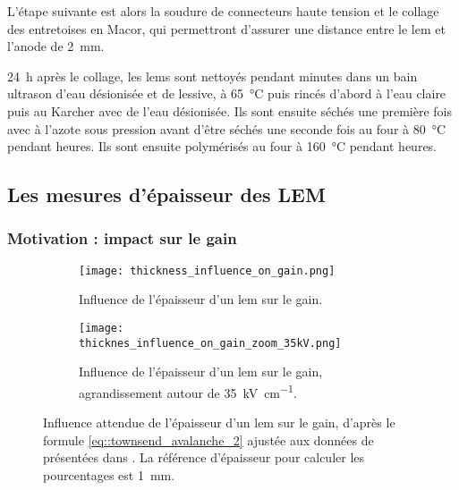             L'étape suivante est alors la soudure de connecteurs haute tension et le collage des entretoises en Macor, qui permettront d'assurer une distance entre le \gls{lem} et l'anode de \SI{2}{\milli\meter}.
            
            \SI{24}{\hour} après le collage, les \glspl{lem} sont nettoyés pendant  minutes dans un bain ultrason d'eau désionisée et de lessive, à \SI{65}{\celsius} puis rincés d'abord à l'eau claire puis au Karcher avec de l'eau désionisée. Ils sont ensuite séchés une première fois avec à l'azote sous pression avant d'être séchés une seconde fois au four à \SI{80}{\celsius} pendant  heures. Ils sont ensuite polymérisés au four à \SI{160}{\celsius} pendant  heures.
        
        \subsection{Les mesures d’épaisseur des LEM}\label{sec::epaisseur}
        
            \subsubsection{Motivation : impact sur le gain}
            
                \begin{figure}[htbp]
                    \begin{subfigure}[t]{0.48\textwidth}
                        \texttt{[image: thickness\_influence\_on\_gain.png]}
                        \caption{Influence de l'épaisseur d'un \gls{lem} sur le gain.}
                    \end{subfigure}
                    \hfill
                    \begin{subfigure}[t]{0.48\textwidth}
                        \texttt{[image: thicknes\_influence\_on\_gain\_zoom\_35kV.png]}
                        \caption{Influence de l'épaisseur d'un \gls{lem} sur le gain, agrandissement autour de \SI{35}{\kilo\volt\per\centi\meter}.}
                    \end{subfigure}
                    \caption[Influence de l'épaisseur d'un \gls{lem} sur le gain.]{Influence attendue de l'épaisseur d'un \gls{lem} sur le gain, d'après le formule \eqref{eq::townsend_avalanche_2} ajustée aux données de présentées dans \cite{cantini3L}. La référence d'épaisseur pour calculer les pourcentages est \SI{1}{\milli\meter}.}
                    \label{fig::thickness_influence_on_gain}
                \end{figure}
            
